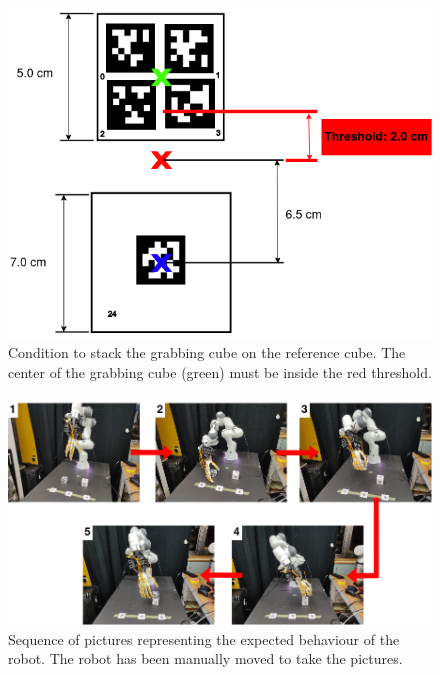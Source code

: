 \documentclass[a4paper]{article}
\begin{document}
\newpage
\begin{figure}[!hb]
    \centering
    \includegraphics[scale=0.6]{images/markers_latex.png}
    \caption{Condition to stack the grabbing cube on the reference cube. The center of the grabbing cube (green) must be inside the red threshold.}
    \label{y_axis}
\end{figure}


\begin{figure}[!hb]
    \centering
    \includegraphics[scale=0.65]{images/movement_sequence.png}
    \caption{Sequence of pictures representing the expected behaviour of the robot. The robot has been manually moved to take the pictures.}
    \label{sequence}
\end{figure}
\end{document}
